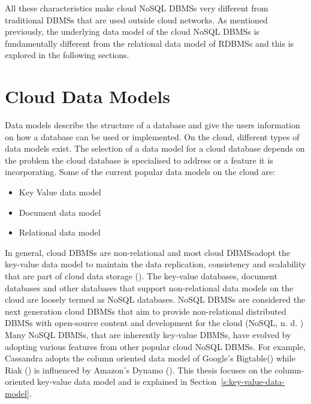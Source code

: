 All these characteristics make cloud \ac{NoSQL} \acp{DBMS} very different from traditional
\acp{DBMS} that are used outside cloud networks.  As mentioned previously,  
the underlying data model of the cloud
\ac{NoSQL} \acp{DBMS} is fundamentally different from the relational data model
of \acp{RDBMS} and this is explored in the following sections. 

\section{Cloud Data Models}\label{s:cloud-data-models}
Data models describe the structure of a database and give the users information
on how a database can be used or implemented.  On the cloud,   different types of
data models exist.  The selection of a data model for a cloud database depends on
the problem the cloud database is specialised to address or a feature it is
incorporating.  Some of the current popular data models on the cloud are:

\begin{itemize}
\item Key Value data model 

\item Document data model 

\item Relational data model
\end{itemize}

In general,   cloud \acp{DBMS} are non-relational and most cloud \acp{DBMS}adopt
the key-value data model to maintain the data replication,   consistency and
scalability that are part of cloud data storage (). The key-value
databases,   document databases and other databases that support non-relational data models
on the cloud are loosely termed as \ac{NoSQL} databases.  \ac{NoSQL} \acp{DBMS}
are considered the next generation cloud \acp{DBMS} that aim to provide
non-relational distributed \acp{DBMS} with open-source content and development
for the cloud (\ac{NoSQL},   n. d. ) Many \ac{NoSQL} \acp{DBMS},   that are inherently
key-value \acp{DBMS},   have evolved by adopting various features from other
popular cloud \ac{NoSQL} \acp{DBMS}.  For example,   Cassandra adopts the column
oriented data model of Google's Bigtable() while Riak () is influenced by
Amazon's Dynamo ().  This thesis focuses on the 
column-oriented key-value data model and is explained in
Section~\ref{s:key-value-data-model}. 

